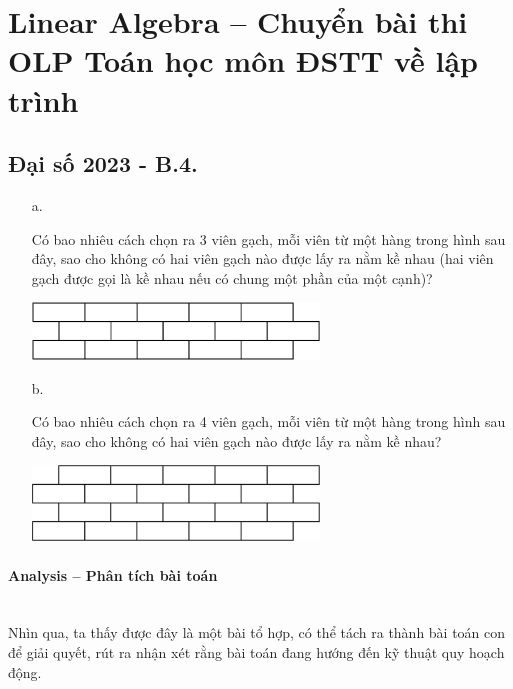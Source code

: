 \documentclass{article}
\begin{document}

\section{Linear Algebra -- Chuyển bài thi OLP Toán học môn ĐSTT về lập trình}

\subsection{Đại số 2023 - B.4.}
    \begin{enumerate}
        \item[a.] {Có bao nhiêu cách chọn ra 3 viên gạch, mỗi viên từ một hàng trong hình sau đây, sao cho không có hai viên gạch nào được lấy ra nằm kề nhau (hai viên gạch được gọi là kề nhau nếu có chung một phần của một cạnh)?
        
        \begin{center}
            \includegraphics[width=0.6\textwidth]{Figures/01.png}
        \end{center}}
        \item[b.] {Có bao nhiêu cách chọn ra 4 viên gạch, mỗi viên từ một hàng trong hình sau đây, sao cho không có hai viên gạch nào được lấy ra nằm kề nhau?
        
        \begin{center}
            \includegraphics[width=0.6\textwidth]{Figures/02.png}
        \end{center}}
    \end{enumerate}

\paragraph{Analysis -- Phân tích bài toán} \mbox{} \\

Nhìn qua, ta thấy được đây là một bài tổ hợp, có thể tách ra thành bài toán con để giải quyết, rút ra nhận xét rằng bài toán đang hướng đến kỹ thuật quy hoạch động. \\
\end{document}
